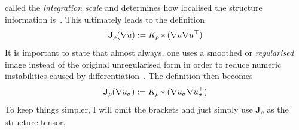called the \textit{integration scale} and determines how localised the structure information
is~\cite{ipcv}.
This ultimately leads to the definition
\begin{equation}
    \mathbf{J}_\rho(\mathbf{\nabla} u) := K_\rho * (\mathbf{\nabla} u\mathbf{\nabla} u^\top)
\end{equation}
It is important to state that almost always, one uses a smoothed or \textit{regularised} image instead of the
original unregularised form in order to reduce numeric instabilities caused by
differentiation~\cite{ipcv}. The definition then becomes
\begin{equation}
    \mathbf{J}_\rho(\mathbf{\nabla} u_\sigma) := K_\rho * (\mathbf{\nabla} u_\sigma\mathbf{\nabla}
    u_\sigma^\top)\label{def:StructTensor}
\end{equation}
To keep things simpler, I will omit the brackets and just simply use $\mathbf{J}_\rho$ as the
structure tensor.\\
